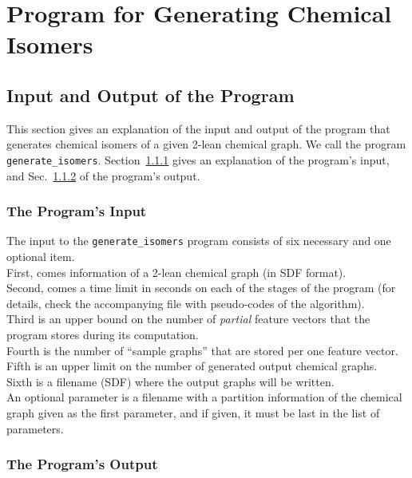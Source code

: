 \documentclass[11pt,titlepage,dvipdfmx,twoside]{article}
\begin{document}
\section{Program for Generating Chemical Isomers}
\label{sec: main}

\subsection{Input and Output of the Program}
\label{sec:InOut_m}

This section gives an explanation of the input and output
of the program that generates chemical isomers
of a given 2-lean chemical graph.
We call the program {\tt generate\_isomers}.
Section~\ref{sec:Input_m} gives an explanation of the program's input, and
Sec.~\ref{sec:Output_m} of the program's output.

\subsubsection{The Program's Input}
\label{sec:Input_m}


The input to the {\tt generate\_isomers} program
consists of six necessary and one optional item. \\
First, comes information of a 2-lean chemical graph (in SDF format).\\
Second, comes a time limit in seconds on each of the stages of the program 
(for details, check the accompanying file with pseudo-codes of the algorithm).\\
Third is an upper bound on the number of {\em partial} feature vectors that the program stores
during its computation. \\
Fourth is the number of ``sample graphs'' that are stored per one feature vector.\\
Fifth is an upper limit on the number of generated output chemical graphs. \\
Sixth is a filename (SDF) where the output graphs will be written.\\
An optional parameter is a filename with a partition information of
the chemical graph given as the first parameter, and if given, it must be last
in the list of parameters.



\subsubsection{The Program's Output}
\label{sec:Output_m}
\end{document}
